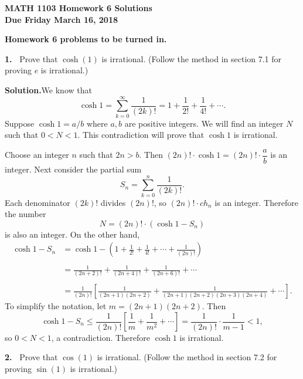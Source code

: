 \documentclass[12pt]{article}
\theoremstyle{definition}
\theoremstyle{remark}
\theoremstyle{definition}
\newenvironment{Solution}{\noindent\textbf{Solution.}}{}
\begin{document}
  

{\bf MATH 1103 Homework 6 Solutions}\\
{\bf Due Friday March 16, 2018}



{\bf Homework 6 problems to be turned in.}

{\bf 1.\ } Prove that $\cosh(1)$ is irrational. (Follow the method in section 7.1 for proving $e$ is irrational.)

\begin{Solution}We know that 
\[\cosh 1=\sum_{k=0}^\infty \frac{1}{(2k)!}=1+\frac{1}{2!}+\frac{1}{4!}+\cdots.\]
Suppose $\cosh 1=a/b$ where $a,b$ are positive integers. 
We will find an integer $N$ such that $0<N<1$. This contradiction will prove that $\cosh 1$ is irrational. 

Choose an integer $n$ such that $2n>b$. Then $(2n)!\cdot \cosh 1=(2n)!\cdot \dfrac{a}{b}$ is an integer. Next consider the partial sum
\[S_n=\sum_{k=0}^{n}\dfrac{1}{(2k)!}.\]
 Each denominator $(2k)!$ divides $(2n)!$, so $(2n)!\cdot ch_n$ is an integer. Therefore the number 
\[N=(2n)!\cdot (\cosh 1-S_n)\]
is also an integer. On the other hand,
\[\begin{split}
\cosh1-S_n
&=\cosh1-\left(1+\frac{1}{2!}+\frac{1}{4!}+\cdots+\frac{1}{(2n)!}\right)\\
&\\
&=\frac{1}{(2n+2)!}+\frac{1}{(2n+4)!}+\frac{1}{(2n+6)!}+\cdots\\
&\\
&=\frac{1}{(2n)!}\left[\frac{1}{(2n+1)(2n+2)}+\frac{1}{(2n+1)(2n+2)(2n+3)(2n+4)}+\cdots\right].
\end{split}
\]
To simplify the notation, let $m=(2n+1)(2n+2)$. Then 
\[\cosh1-S_n\leq 
\frac{1}{(2n)!}\left[\frac{1}{m}+\frac{1}{m^2}+\cdots\right]=\frac{1}{(2n)!}\cdot \frac{1}{m-1}<1,
\]
so $0<N<1$, a contradiction. Therefore $\cosh 1$ is irrational. 



\end{Solution}

\newpage
{\bf 2.\ } Prove that $\cos(1)$ is irrational. (Follow the method in section 7.2 for proving $\sin(1)$ is irrational.)
\end{document}
